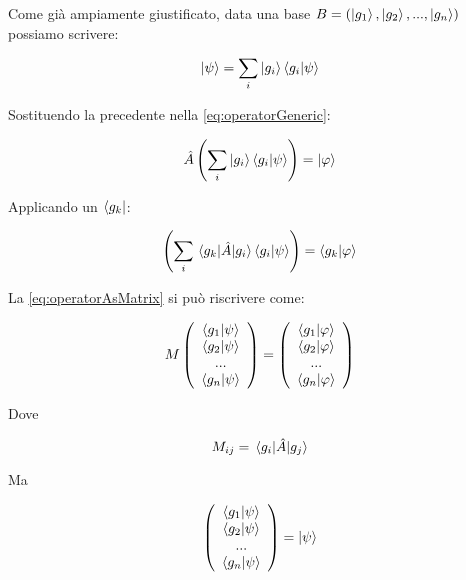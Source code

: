 Come già ampiamente giustificato, data una base $B = (\ket{g_1}, \ket{g_2}, ..., \ket{g_n})$ possiamo scrivere:

	\begin{equation}
		\ket{\psi} = \sum_i \ket{g_i} \braket{g_i}{\psi}
	\end{equation}

Sostituendo la precedente nella \eqref{eq:operatorGeneric}:

	\begin{equation}
		\hat{A} \left ( \sum_i \ket{g_i} \braket{g_i}{\psi} \right ) = \ket{\varphi}
	\end{equation}

Applicando un $\bra{g_k}$:

	\begin{equation} \label{eq:operatorAsMatrix}
		\left ( \sum_i \mel{g_k}{\hat{A}}{g_i} \braket{g_i}{\psi} \right ) = \braket{g_k}{\varphi}
	\end{equation}

La \eqref{eq:operatorAsMatrix} si può riscrivere come:

	\begin{equation}
		M \left ( \begin{array}{c}
				\braket{g_1}{\psi} \\
				\braket{g_2}{\psi} \\
				... \\
				\braket{g_n}{\psi} \\
			\end{array}
		\right ) = \left ( \begin{array}{c}
				\braket{g_1}{\varphi} \\
				\braket{g_2}{\varphi} \\
				... \\
				\braket{g_n}{\varphi} \\
			\end{array}
		\right )
	\end{equation}

Dove

	\begin{equation}
		M_{ij} = \mel{g_i}{\hat{A}}{g_j} 
	\end{equation}

Ma

	\begin{equation}
		\left ( \begin{array}{c}
				\braket{g_1}{\psi} \\
				\braket{g_2}{\psi} \\
				... \\
				\braket{g_n}{\psi} \\
			\end{array}
		\right ) = \ket{\psi}
	\end{equation}

